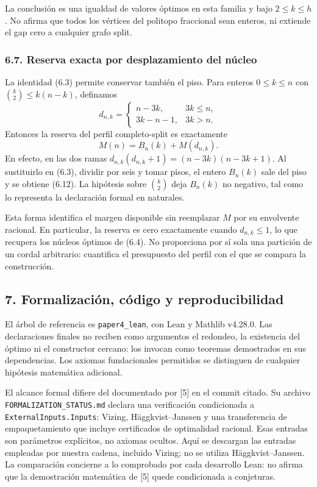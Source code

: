 \documentclass[spanish,11pt,a4paper]{article}
\begin{document}
La conclusión es una igualdad de valores óptimos en esta familia y bajo \(2\le k\le h\). No afirma que todos los vértices del politopo fraccional sean enteros, ni extiende el gap cero a cualquier grafo split.

\subsubsection{6.7. Reserva exacta por desplazamiento del núcleo}\label{reserva-exacta-por-desplazamiento-del-nuxfacleo}

La identidad (6.3) permite conservar también el piso. Para enteros \(0\le k\le n\) con \(\binom k2\le k(n-k)\), definamos \[
d_{n,k}=\begin{cases}n-3k,&3k\le n,\\3k-n-1,&3k>n.\end{cases}
\] Entonces la reserva del perfil completo-split es exactamente \[
M(n)=B_n(k)+M(d_{n,k}).
\tag{6.12}
\] En efecto, en las dos ramas \(d_{n,k}(d_{n,k}+1)=(n-3k)(n-3k+1)\). Al sustituirlo en (6.3), dividir por seis y tomar pisos, el entero \(B_n(k)\) sale del piso y se obtiene (6.12). La hipótesis sobre \(\binom k2\) deja \(B_n(k)\) no negativo, tal como lo representa la declaración formal en naturales.

Esta forma identifica el margen disponible sin reemplazar \(M\) por su envolvente racional. En particular, la reserva es cero exactamente cuando \(d_{n,k}\le1\), lo que recupera los núcleos óptimos de (6.4). No proporciona por sí sola una partición de un cordal arbitrario: cuantifica el presupuesto del perfil con el que se compara la construcción.

\subsection{7. Formalización, código y reproducibilidad}\label{formalizaciuxf3n-cuxf3digo-y-reproducibilidad}

El árbol de referencia es \nolinkurl{paper4_lean}, con Lean y Mathlib v4.28.0. Las declaraciones finales no reciben como argumentos el redondeo, la existencia del óptimo ni el constructor cercano: los invocan como teoremas demostrados en sus dependencias. Los axiomas fundacionales permitidos se distinguen de cualquier hipótesis matemática adicional.

El alcance formal difiere del documentado por {[}5{]} en el commit citado. Su archivo \nolinkurl{FORMALIZATION_STATUS.md} declara una verificación condicionada a \nolinkurl{ExternalInputs.Inputs}: Vizing, Häggkvist--Janssen y una transferencia de empaquetamiento que incluye certificados de optimalidad racional. Esas entradas son parámetros explícitos, no axiomas ocultos. Aquí se descargan las entradas empleadas por nuestra cadena, incluido Vizing; no se utiliza Häggkvist--Janssen. La comparación concierne a lo comprobado por cada desarrollo Lean: no afirma que la demostración matemática de {[}5{]} quede condicionada a conjeturas.
\end{document}
